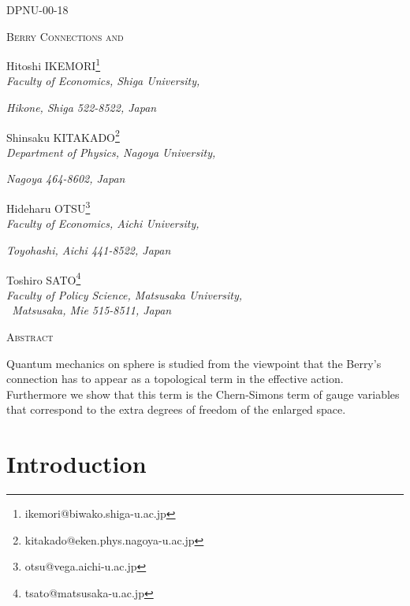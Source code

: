 \documentclass[12pt,a4paper]{article}
\begin{document}
\begin{flushright}
DPNU-00-18
\end{flushright}
\vspace{30pt}

\begin{center}
{\LARGE \scshape Berry Connections and }



Hitoshi IKEMORI\footnote{%
ikemori@biwako.shiga-u.ac.jp} \\[0pt]
\textit{Faculty of Economics, Shiga University,}

\textit{Hikone, Shiga 522-8522, Japan}

\medskip

Shinsaku KITAKADO\footnote{%
kitakado@eken.phys.nagoya-u.ac.jp} \\[0pt]
\textit{Department of Physics, Nagoya University,}

\textit{Nagoya 464-8602, Japan}

\medskip

Hideharu OTSU\footnote{%
otsu@vega.aichi-u.ac.jp} \\[0pt]
\textit{Faculty of Economics, Aichi University, }

\textit{Toyohashi, Aichi 441-8522, Japan}

\medskip

Toshiro SATO\footnote{%
tsato@matsusaka-u.ac.jp} \\[0pt]
\textit{Faculty of Policy Science, Matsusaka University,}\\[0pt]
\textit{\ Matsusaka, Mie 515-8511, Japan\bigskip }

\vspace{30pt} {\Large \scshape Abstract}
\end{center}

Quantum mechanics on sphere \coordHE{} is studied from the viewpoint that the
Berry's connection has to appear as a topological term in the effective
action. Furthermore we show that this term is the Chern-Simons term of gauge
variables that correspond to the extra degrees of freedom of the enlarged
space.\newpage

\section{Introduction}
\end{document}

